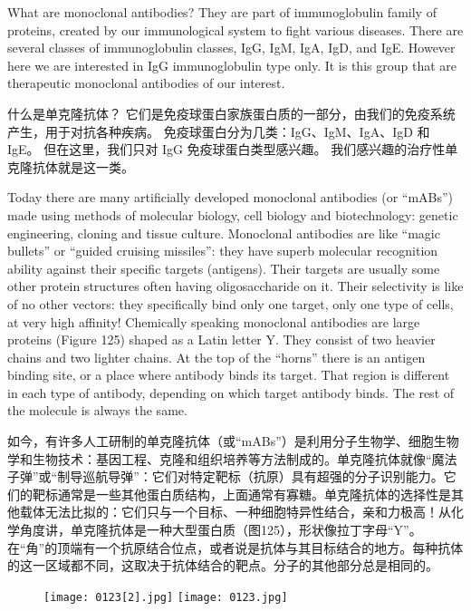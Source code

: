 \documentclass[dvipsnames, svgnames,a4paper,11pt]{article}
\begin{document}
What are monoclonal antibodies? They are part of immunoglobulin family of proteins,
created by our immunological system to fight various diseases. There are several
classes of immunoglobulin classes, IgG, IgM, IgA, IgD, and IgE. However here we
are interested in IgG immunoglobulin type only. It is this group that are therapeutic
monoclonal antibodies of our interest.

什么是单克隆抗体？ 它们是免疫球蛋白家族蛋白质的一部分，由我们的免疫系统产生，用于对抗各种疾病。 免疫球蛋白分为几类：IgG、IgM、IgA、IgD 和 IgE。 但在这里，我们只对 IgG 免疫球蛋白类型感兴趣。 我们感兴趣的治疗性单克隆抗体就是这一类。

Today there are many artificially developed monoclonal antibodies (or “mABs”) made
using methods of molecular biology, cell biology and biotechnology: genetic
engineering, cloning and tissue culture. Monoclonal antibodies are like “magic bullets”
or “guided cruising missiles”: they have superb molecular recognition ability against
their specific targets (antigens). Their targets are usually some other protein
structures often having oligosaccharide on it. Their selectivity is like of no other
vectors: they specifically bind only one target, only one type of cells, at very high
affinity! Chemically speaking monoclonal antibodies are large proteins (Figure 125)
shaped as a Latin letter Y. They consist of two heavier chains and two lighter chains.
At the top of the “horns” there is an antigen binding site, or a place where antibody
binds its target. That region is different in each type of antibody, depending on which
target antibody binds. The rest of the molecule is always the same.

如今，有许多人工研制的单克隆抗体（或“mABs”）是利用分子生物学、细胞生物学和生物技术：基因工程、克隆和组织培养等方法制成的。单克隆抗体就像“魔法子弹”或“制导巡航导弹”：它们对特定靶标（抗原）具有超强的分子识别能力。它们的靶标通常是一些其他蛋白质结构，上面通常有寡糖。单克隆抗体的选择性是其他载体无法比拟的：它们只与一个目标、一种细胞特异性结合，亲和力极高！从化学角度讲，单克隆抗体是一种大型蛋白质（图125），形状像拉丁字母“Y”。在“角”的顶端有一个抗原结合位点，或者说是抗体与其目标结合的地方。每种抗体的这一区域都不同，这取决于抗体结合的靶点。分子的其他部分总是相同的。

\begin{figure}[h]
	\centering
    \texttt{[image: 0123[2].jpg]}    
    \hspace{0.1in}
    \texttt{[image: 0123.jpg]} 
     \label{fig125}
\end{figure}
\end{document}
